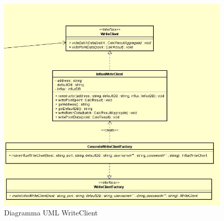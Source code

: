 \begin{figure} [H]
	\centering
	\includegraphics[scale=0.5]{Img/WriteClient}
	\caption{Diagramma UML WriteClient}\label{}
\end{figure}

